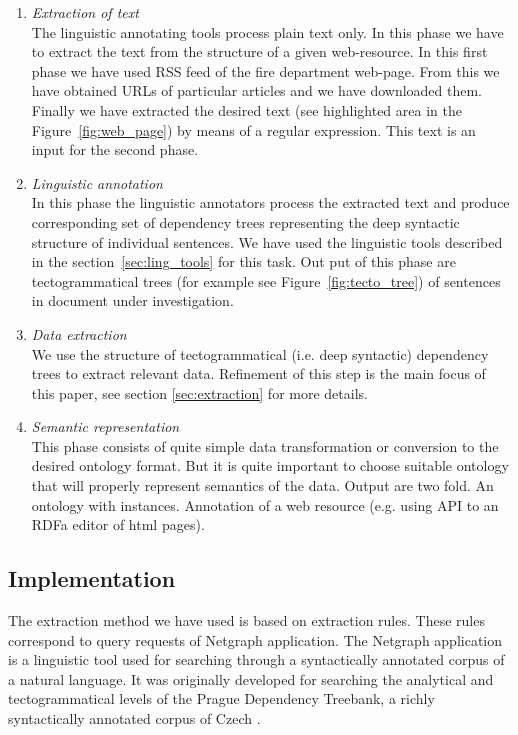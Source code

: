 \begin{enumerate}
\item \emph{Extraction of text} \\ The linguistic annotating tools process plain text only. In this phase we have to extract the text from the structure of a given web-resource. In this first phase we have used RSS feed of the fire department web-page. From this we have obtained URLs of particular articles and we have downloaded them. Finally we have extracted the desired text (see highlighted area in the Figure~\ref{fig:web_page}) by means of a regular expression. This text is an input for the second phase.

\item \emph{Linguistic annotation} \\ In this phase the linguistic annotators process the extracted text and produce corresponding set of dependency trees representing the deep syntactic structure of individual sentences. We have used the linguistic tools described in the section~\ref{sec:ling_tools} for this task. Out put of this phase are tectogrammatical trees (for example see Figure~\ref{fig:tecto_tree}) of sentences in document under investigation.

\item \emph{Data extraction} \\ We use the structure of tectogrammatical (i.e. deep syntactic) dependency trees to extract relevant data. Refinement of this step is the main focus of this paper, see section \ref{sec:extraction} for more details.

\item \emph{Semantic representation} \\ This phase consists of quite simple data transformation or conversion to the desired ontology format. But it is quite important to choose suitable ontology that will properly represent semantics of the data. Output are two fold. An ontology with instances. Annotation of a web resource (e.g. using API to an RDFa editor of html pages).

\end{enumerate}



\subsection{Implementation}
The extraction method we have used is based on extraction rules. These rules correspond to query requests of Netgraph application. The Netgraph application \citep{biblio:MiNetgraphA2006} is a linguistic tool used for searching through a syntactically annotated corpus of a natural language. It was originally developed for searching the analytical and tectogrammatical levels of the Prague Dependency Treebank, a richly syntactically annotated corpus of Czech \citep{biblio:PDT20_CD}.

